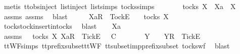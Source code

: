 \ {\isacharparenleft}metis\ ttobs{\isachardot}inject{\isacharparenleft}{}{\isacharparenright}\ list{\isachardot}inject\ list{\isachardot}simps{\isacharparenleft}{}{\isacharparenright}\ tocks{\isachardot}simps{\isacharparenright}\isanewline
\ \ \isamarkupfalse%
\ \isamarkupfalse%
\ {\isachardoublequoteopen}{\isasymrho}\ {\isasymin}\ tocks\ X\ {\isasymand}\ Xa\ {\isasymsubseteq}\ X{\isachardoublequoteclose}\isanewline
\ \ \ \ \isamarkupfalse%
\ assms{\isacharparenleft}{}{\isacharparenright}\ assms{\isacharparenleft}{}{\isacharparenright}\ \isamarkupfalse%
\ blast\isanewline
\ \ \isamarkupfalse%
\ \isamarkupfalse%
\ {\isachardoublequoteopen}{\isacharbrackleft}Xa{\isacharbrackright}\isactrlsub R\ {\isacharhash}\ {\isacharbrackleft}Tock{\isacharbrackright}\isactrlsub E\ {\isacharhash}\ {\isasymrho}\ {\isasymin}\ tocks\ X{\isachardoublequoteclose}\isanewline
\ \ \ \ \isamarkupfalse%
\ tocks{\isachardot}tock{\isacharunderscore}insert{\isacharunderscore}in{\isacharunderscore}tocks\ \isamarkupfalse%
\ blast\isanewline
{}\isamarkupfalse%
\isanewline
\ \ \isamarkupfalse%
\ Xa\ {\isasymrho}\ {\isasymsigma}\isanewline
\ \ \isamarkupfalse%
\ assms{\isacharcolon}\ {\isachardoublequoteopen}{\isasymsigma}\ {\isasymin}\ tocks\ X{\isachardoublequoteclose}\ {\isachardoublequoteopen}{\isacharbrackleft}Xa{\isacharbrackright}\isactrlsub R\ {\isacharhash}\ {\isacharbrackleft}Tick{\isacharbrackright}\isactrlsub E\ {\isacharhash}\ {\isasymrho}\ {\isasymsubseteq}\isactrlsub C\ {\isasymsigma}{\isachardoublequoteclose}\isanewline
\ \ \isamarkupfalse%
\ \isamarkupfalse%
\ {\isasymsigma}{\isacharprime}\ Y\ \ {\isachardoublequoteopen}{\isasymsigma}\ {\isacharequal}\ {\isacharbrackleft}Y{\isacharbrackright}\isactrlsub R\ {\isacharhash}\ {\isacharbrackleft}Tick{\isacharbrackright}\isactrlsub E\ {\isacharhash}\ {\isasymsigma}{\isacharprime}{\isachardoublequoteclose}\isanewline
\ \ \ \ \isamarkupfalse%
\ ttWF{\isachardot}simps{\isacharparenleft}{}{}{\isacharparenright}\ tt{\isacharunderscore}prefix{\isacharunderscore}subset{\isacharunderscore}ttWF\ tt{\isacharunderscore}subset{\isacharunderscore}imp{\isacharunderscore}prefix{\isacharunderscore}subset\ tocks{\isacharunderscore}wf\ \isamarkupfalse%
\ blast\isanewline
\ \ \isamarkupfalse%
